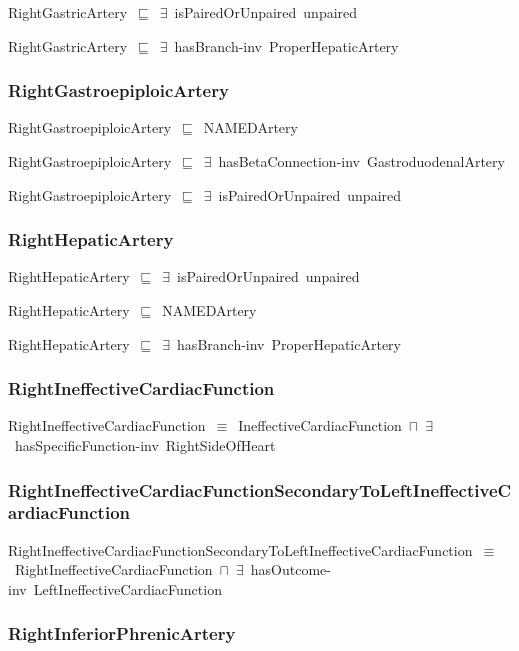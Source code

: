 \documentclass{article}
\begin{document}
RightGastricArtery~\ensuremath{\sqsubseteq}~\ensuremath{\exists}~isPairedOrUnpaired~unpaired~

RightGastricArtery~\ensuremath{\sqsubseteq}~\ensuremath{\exists}~hasBranch-inv~ProperHepaticArtery~

\subsubsection*{RightGastroepiploicArtery}

RightGastroepiploicArtery~\ensuremath{\sqsubseteq}~NAMEDArtery~

RightGastroepiploicArtery~\ensuremath{\sqsubseteq}~\ensuremath{\exists}~hasBetaConnection-inv~GastroduodenalArtery~

RightGastroepiploicArtery~\ensuremath{\sqsubseteq}~\ensuremath{\exists}~isPairedOrUnpaired~unpaired~

\subsubsection*{RightHepaticArtery}

RightHepaticArtery~\ensuremath{\sqsubseteq}~\ensuremath{\exists}~isPairedOrUnpaired~unpaired~

RightHepaticArtery~\ensuremath{\sqsubseteq}~NAMEDArtery~

RightHepaticArtery~\ensuremath{\sqsubseteq}~\ensuremath{\exists}~hasBranch-inv~ProperHepaticArtery~

\subsubsection*{RightIneffectiveCardiacFunction}

RightIneffectiveCardiacFunction~\ensuremath{\equiv}~IneffectiveCardiacFunction~\ensuremath{\sqcap}~\ensuremath{\exists}~hasSpecificFunction-inv~RightSideOfHeart

\subsubsection*{RightIneffectiveCardiacFunctionSecondaryToLeftIneffectiveCardiacFunction}

RightIneffectiveCardiacFunctionSecondaryToLeftIneffectiveCardiacFunction~\ensuremath{\equiv}~RightIneffectiveCardiacFunction~\ensuremath{\sqcap}~\ensuremath{\exists}~hasOutcome-inv~LeftIneffectiveCardiacFunction

\subsubsection*{RightInferiorPhrenicArtery}
\end{document}
